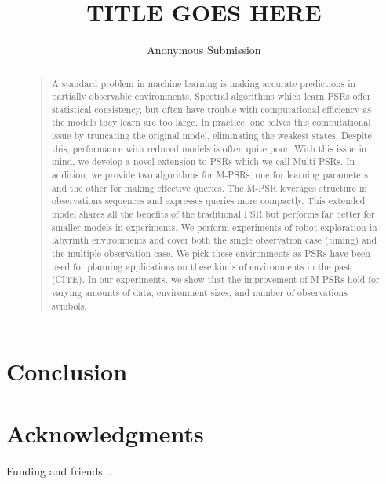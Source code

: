 \documentclass[letterpaper]{article}
\begin{document}
\title{TITLE GOES HERE}
\author{Anonymous Submission}
\maketitle

\begin{abstract}
\begin{quote}
A standard problem in machine learning is making accurate predictions in partially observable environments. Spectral algorithms which learn PSRs offer statistical consistency, but often have trouble with computational efficiency as the models they learn are too large. In practice, one solves this computational issue by truncating the original model, eliminating the weakest states. Despite this, performance with reduced models is often quite poor. With this issue in mind, we develop a novel extension to PSRs which we call Multi-PSRs. In addition, we provide two algorithms for M-PSRs, one for learning parameters and the other for making effective queries. The M-PSR leverages structure in observations sequences and expresses queries more compactly. This extended model shares all the benefits of the traditional PSR but performs far better for smaller models in experiments. We perform experiments of robot exploration in labyrinth environments and cover both the single observation case (timing) and the multiple observation case. We pick these environments as PSRs have been used for planning applications on these kinds of environments in the past (CITE). In our experiments, we show that the improvement of M-PSRs hold for varying amounts of data, environment sizes, and number of observations symbols.
\end{quote}
\end{abstract}






\section{Conclusion}

\section{Acknowledgments}
Funding and friends...



\end{document}

